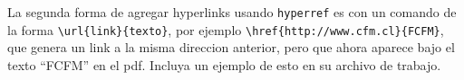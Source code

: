 \documentclass[11pt]{exam}
\begin{document}
\begin{questions}
\item La segunda forma de agregar hyperlinks usando \texttt{hyperref} es con un comando de la forma \verb|\url{link}{texto}|, por ejemplo \verb|\href{http://www.cfm.cl}{FCFM}|, que genera un link a la misma direccion anterior, pero que ahora aparece bajo el texto ``FCFM'' en el pdf. Incluya un ejemplo de esto en su archivo de trabajo.



%
%
%
%
%
%
\end{questions}
\end{document}
